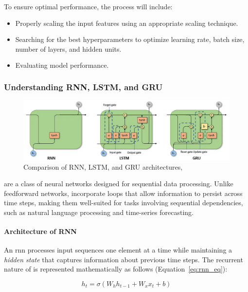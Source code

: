 To ensure optimal performance, the process will include:
\begin{itemize}
    \item Properly scaling the input features using an appropriate scaling technique.
    \item Searching for the best hyperparameters to optimize learning rate, batch size, number of layers, and hidden units.
    \item Evaluating model performance.
\end{itemize}

\subsubsection{Understanding RNN, LSTM, and GRU}

\begin{figure}[H]
    \centering
    \caption{Comparison of RNN, LSTM, and GRU architectures,}
    \label{fig:rnn-lstm-gru}
    \includegraphics[width=\textwidth]{img/sections/main/rnn-lstm-gru.png}
\end{figure}

 are a class of neural networks designed for sequential data processing. Unlike feedforward 
networks,  incorporate loops that allow information to persist across time steps, making them well-suited 
for tasks involving sequential dependencies, such as natural language processing and time-series forecasting.

\paragraph{Architecture of RNN} An \acrshort{rnn} processes input sequences one element at a time while maintaining a
\emph{hidden state} that captures information about previous time steps. The recurrent nature of  is 
represented mathematically as follows (Equation~\ref{eq:rnn_eq}):

\begin{equation}
    \label{eq:rnn_eq}
    h_t = \sigma(W_h h_{t-1} + W_x x_t + b)
\end{equation}

